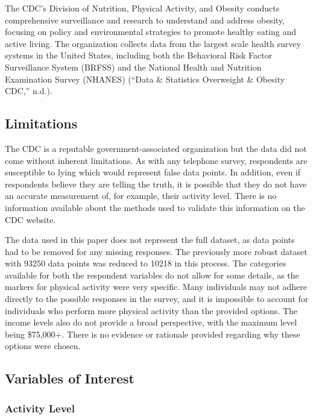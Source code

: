 \documentclass[
  letterpaper,
  DIV=11,
  numbers=noendperiod]{scrartcl}
\begin{document}
The CDC's Division of Nutrition, Physical Activity, and Obesity conducts
comprehensive surveillance and research to understand and address
obesity, focusing on policy and environmental strategies to promote
healthy eating and active living. The organization collects data from
the largest scale health survey systems in the United States, including
both the Behavioral Risk Factor Surveillance System (BRFSS) and the
National Health and Nutrition Examination Survey (NHANES) ({``Data \&
Statistics \textbar{} Overweight \& Obesity \textbar{} CDC,''} n.d.).

\hypertarget{limitations}{%
\subsection{Limitations}\label{limitations}}

The CDC is a reputable government-associated organization but the data
did not come without inherent limitations. As with any telephone survey,
respondents are susceptible to lying which would represent false data
points. In addition, even if respondents believe they are telling the
truth, it is possible that they do not have an accurate measurement of,
for example, their activity level. There is no information available
about the methods used to validate this information on the CDC website.

The data used in this paper does not represent the full dataset, as data
points had to be removed for any missing responses. The previously more
robust dataset with 93250 data points was reduced to 10218 in this
process. The categories available for both the respondent variables do
not allow for some details, as the markers for physical activity were
very specific. Many individuals may not adhere directly to the possible
responses in the survey, and it is impossible to account for individuals
who perform more physical activity than the provided options. The income
levels also do not provide a broad perspective, with the maximum level
being \$75,000+. There is no evidence or rationale provided regarding
why these options were chosen.

\hypertarget{variables-of-interest}{%
\subsection{Variables of Interest}\label{variables-of-interest}}

\hypertarget{activity-level}{%
\subsubsection{Activity Level}\label{activity-level}}
\end{document}
